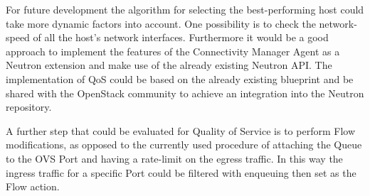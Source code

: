 For future development the algorithm for selecting the best-performing host could take more dynamic factors into account. One possibility is to check the network-speed of all the host's network interfaces. Furthermore it would be a good approach to implement the features of the Connectivity Manager Agent as a Neutron extension and make use of the already existing Neutron API. The implementation of QoS could be based on the already existing blueprint and be shared with the OpenStack community to achieve an integration into the Neutron repository.

A further step that could be evaluated for Quality of Service is to perform Flow modifications, as opposed to the currently used procedure of attaching the Queue to the OVS Port and having a rate-limit on the egress traffic. In this way the ingress traffic for a specific Port could be filtered with enqueuing then set as the Flow action. 